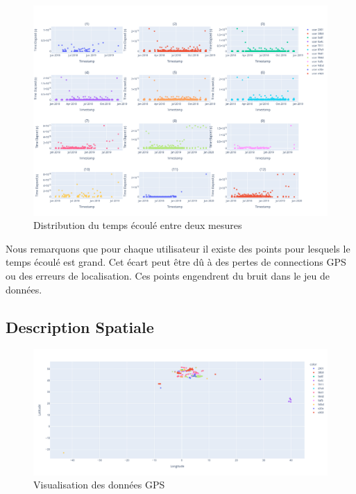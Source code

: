 \documentclass[10pt,a4paper]{article}
\begin{document}
\begin{figure}[H]
    \includegraphics[scale=0.3]{time_elapse}
    \centering
    \caption{Distribution du temps écoulé entre deux mesures}
    \label{fig:figure5}
\end{figure}

Nous remarquons que pour chaque utilisateur il existe des points pour lesquels le temps écoulé est grand.
Cet écart peut être dû à des pertes de connections GPS ou des erreurs de localisation. Ces points engendrent du bruit
dans le jeu de données.

\vspace{5mm}
\subsection{Description Spatiale}

\begin{figure}[H]
    \includegraphics[scale=0.3]{gps_data}
    \centering
    \caption{Visualisation des données GPS}
    \label{fig:figure6}
\end{figure}
\end{document}
